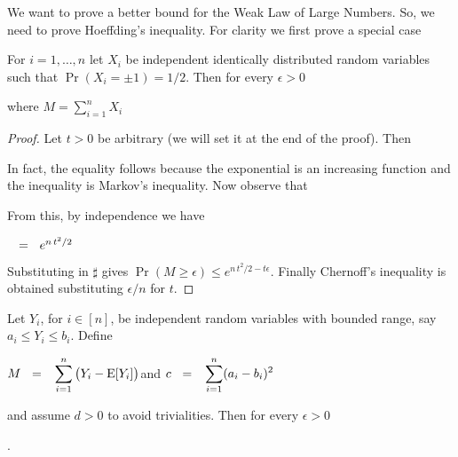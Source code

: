 \documentclass[sputnik.tex]{subfiles}
\begin{document}
We want to prove a better bound for the Weak Law of Large Numbers. So, we need to prove Hoeffding's inequality. For clarity we first prove a special case 


\begin{lemma}\label{Chernoff}
For $i=1,\dots,n$ let $X_i$ be independent identically distributed random variables such that\/ $\Pr(X_i=\pm1)=1/2$.
Then for every $\epsilon>0$

\hfill where $\displaystyle M=\sum^n_{i=1}X_i$
\end{lemma}
\begin{proof}
Let $t>0$ be arbitrary (we will set it at the end of the proof).
Then



In fact, the equality follows because the exponential is an increasing function and the inequality is Markov's inequality.
Now observe that






From this, by independence we have 

$\medrel{=}e^{n\,t^2/2}$

Substituting in $\sharp$ gives $\Pr(M\ge\epsilon)\le e^{n\,t^2/2-t\epsilon}$.
Finally Chernoff's inequality is obtained substituting $\epsilon/n$ for $t$.
\end{proof}


\begin{void_thm}\label{Chebyshev}
Let $Y_i$, for $i\in[n]$, be independent random variables with bounded range, say $a_i\le Y_i\le b_i$.
Define

\hfil$\displaystyle M\medrel{=}\sum^n_{i=1}\big(Y_i-{\rm E}[Y_i]\big)$\hfil and \hfil $\displaystyle c\medrel{=}\sum^n_{i=1}(a_i-b_i)^2$

and assume $d>0$ to avoid trivialities. Then for every $\epsilon>0$ 

.
\end{void_thm}
\end{document}
